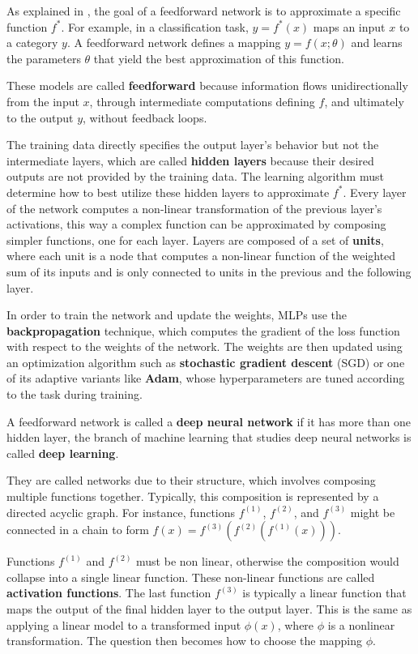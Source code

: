 As explained in 
\cite{goodfellow2016deep},
the goal of a feedforward network is to approximate a specific function
\( f^* \). For example, in a classification task,
\( y = f^*(x) \) maps an input \( x \) to a category \( y \).
A feedforward network defines a mapping \( y = f(x; \theta) \) and
learns the parameters \( \theta \) that yield the best approximation
of this function.

These models are called \textbf{feedforward} because information
flows unidirectionally from the input \( x \), through intermediate computations
defining \( f \), and ultimately to the output \( y \), without feedback loops.

The training data directly specifies the output layer's behavior but
not the intermediate layers, which are called \textbf{hidden layers}
because their desired outputs are not provided by the training data.
The learning algorithm must determine how to best utilize these
hidden layers to approximate \( f^* \).
Every layer of the network computes a non-linear transformation of the
previous layer's activations, this way a complex function can be
approximated by composing simpler functions, one for each layer.
Layers are composed of a set of \textbf{units}, where each unit is a node that
computes a non-linear function of the weighted sum of its inputs
and is only connected to units in the previous and the following layer.

In order to train the network and update the weights, MLPs use the
\textbf{backpropagation} technique, which computes the gradient of the
loss function with respect to the weights of the network.
The weights are then updated using an optimization algorithm such as
\textbf{stochastic gradient descent} (SGD)
or one of its adaptive variants like \textbf{Adam},
whose hyperparameters are tuned according to the task during training.

A feedforward network is called a \textbf{deep neural network} if it has
more than one hidden layer, the branch of machine learning that studies
deep neural networks is called \textbf{deep learning}.

They are called networks due to their structure, which involves composing
multiple functions together. Typically, this composition is represented
by a directed acyclic graph. For instance, functions
\( f^{(1)} \), \( f^{(2)} \), and \( f^{(3)} \) might be connected in
a chain to form \( f(x) = f^{(3)}(f^{(2)}(f^{(1)}(x))) \).

Functions \( f^{(1)} \) and \( f^{(2)} \) must
be non linear, otherwise the composition would collapse into a single
linear function. These non-linear functions are
called \textbf{activation functions}.
The last function \( f^{(3)} \) is typically a linear function that maps
the output of the final hidden layer to the output layer.
This is the same as applying a linear model to a transformed
input \( \phi(x) \), where \( \phi \) is a nonlinear transformation.
The question then becomes how to choose the mapping \( \phi \).

